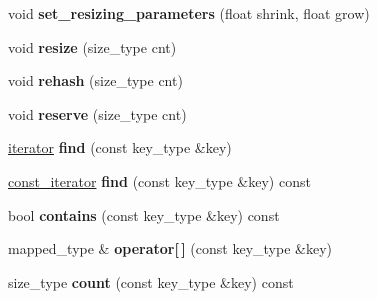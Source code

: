 \begin{DoxyCompactItemize}
\item 
void {\bfseries set\+\_\+resizing\+\_\+parameters} (float shrink, float grow)\hypertarget{classspp___1_1sparse__hash__map_a5878a128ca7c6fddfb6eaa41e45cc528}{}\label{classspp___1_1sparse__hash__map_a5878a128ca7c6fddfb6eaa41e45cc528}

\item 
void {\bfseries resize} (size\+\_\+type cnt)\hypertarget{classspp___1_1sparse__hash__map_acc3a51c0afd622cb31a40ca1860245ae}{}\label{classspp___1_1sparse__hash__map_acc3a51c0afd622cb31a40ca1860245ae}

\item 
void {\bfseries rehash} (size\+\_\+type cnt)\hypertarget{classspp___1_1sparse__hash__map_a2138cf82ef171bdf6426059b28a383e8}{}\label{classspp___1_1sparse__hash__map_a2138cf82ef171bdf6426059b28a383e8}

\item 
void {\bfseries reserve} (size\+\_\+type cnt)\hypertarget{classspp___1_1sparse__hash__map_a84ddaafce1240b88b8ac510eee48f90b}{}\label{classspp___1_1sparse__hash__map_a84ddaafce1240b88b8ac510eee48f90b}

\item 
\hyperlink{classspp___1_1_two__d__iterator}{iterator} {\bfseries find} (const key\+\_\+type \&key)\hypertarget{classspp___1_1sparse__hash__map_aad6094e0a01e850461d0b30c74053d58}{}\label{classspp___1_1sparse__hash__map_aad6094e0a01e850461d0b30c74053d58}

\item 
\hyperlink{classspp___1_1_two__d__iterator}{const\+\_\+iterator} {\bfseries find} (const key\+\_\+type \&key) const \hypertarget{classspp___1_1sparse__hash__map_afef543b2388b89cd6bb431f3ae0a1926}{}\label{classspp___1_1sparse__hash__map_afef543b2388b89cd6bb431f3ae0a1926}

\item 
bool {\bfseries contains} (const key\+\_\+type \&key) const \hypertarget{classspp___1_1sparse__hash__map_a75cf54f194d5985f69e0a609392b3fb0}{}\label{classspp___1_1sparse__hash__map_a75cf54f194d5985f69e0a609392b3fb0}

\item 
mapped\+\_\+type \& {\bfseries operator\mbox{[}$\,$\mbox{]}} (const key\+\_\+type \&key)\hypertarget{classspp___1_1sparse__hash__map_a62bd144f2ce2d48c815da8f533ae90ff}{}\label{classspp___1_1sparse__hash__map_a62bd144f2ce2d48c815da8f533ae90ff}

\item 
size\+\_\+type {\bfseries count} (const key\+\_\+type \&key) const \hypertarget{classspp___1_1sparse__hash__map_a86ab7b3e8397d85a3fbc877a245c09f7}{}\label{classspp___1_1sparse__hash__map_a86ab7b3e8397d85a3fbc877a245c09f7}


\end{DoxyCompactItemize}
